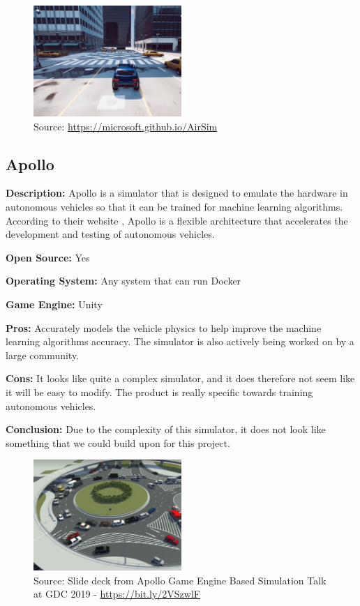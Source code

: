 \begin{figure}[H]
    \centering
    \includegraphics[width=0.5\textwidth]{Simulators/AirSim.JPG}
    \caption{Source: \url{https://microsoft.github.io/AirSim}}
\end{figure}

\subsection{Apollo} \label{Apollo}
\textbf{Description:} Apollo is a simulator that is designed to emulate the hardware in autonomous vehicles so that it can be trained for machine learning algorithms. According to their website \cite{Apollo_Website}, Apollo is a flexible architecture that accelerates the development and testing of autonomous vehicles.

\textbf{Open Source:} Yes

\textbf{Operating System:} Any system that can run Docker

\textbf{Game Engine:} Unity

\textbf{Pros:} Accurately models the vehicle physics to help improve the machine learning algorithms accuracy. The simulator is also actively being worked on by a large community.  

\textbf{Cons:} It looks like quite a complex simulator, and it does therefore not seem like it will be easy to modify. The product is really specific towards training autonomous vehicles. 

\textbf{Conclusion:} Due to the complexity of this simulator, it does not look like something that we could build upon for this project. 

\begin{figure}[H]
    \centering
    \includegraphics[width=0.5\textwidth]{Simulators/Apollo.JPG}
    \caption{Source: Slide deck from Apollo Game Engine Based Simulation Talk at GDC 2019 - \url{https://bit.ly/2VSzwlF}}
\end{figure}

